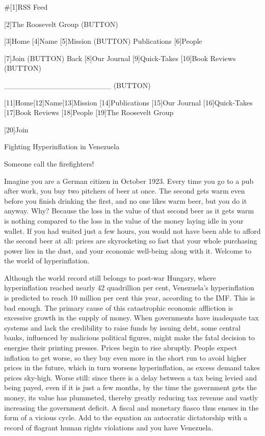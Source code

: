    #[1]RSS Feed

   [2]The Roosevelt Group
   (BUTTON)

   [3]Home [4]Name [5]Mission (BUTTON) Publications [6]People

   [7]Join
   (BUTTON) Back [8]Our Journal [9]Quick-Takes [10]Book Reviews
   (BUTTON)

   ____________________ (BUTTON)

   [11]Home[12]Name[13]Mission [14]Publications [15]Our Journal
   [16]Quick-Takes [17]Book Reviews [18]People
   [19]The Roosevelt Group

   [20]Join

Fighting Hyperinflation in Venezuela

Someone call the firefighters!


   Imagine you are a German citizen in October 1923. Every time you go to
   a pub after work, you buy two pitchers of beer at once. The second gets
   warm even before you finish drinking the first, and no one likes warm
   beer, but you do it anyway. Why? Because the loss in the value of that
   second beer as it gets warm is nothing compared to the loss in the
   value of the money laying idle in your wallet. If you had waited just a
   few hours, you would not have been able to afford the second beer at
   all: prices are skyrocketing so fast that your whole purchasing power
   lies in the dust, and your economic well-being along with it. Welcome
   to the world of hyperinflation.

   Although the world record still belongs to post-war Hungary, where
   hyperinflation reached nearly 42 quadrillion per cent, Venezuela's
   hyperinflation is predicted to reach 10 million per cent this year,
   according to the IMF. This is bad enough. The primary cause of this
   catastrophic economic affliction is excessive growth in the supply of
   money. When governments have inadequate tax systems and lack the
   credibility to raise funds by issuing debt, some central banks,
   influenced by malicious political figures, might make the fatal
   decision to energise their printing presses. Prices begin to rise
   abruptly. People expect inflation to get worse, so they buy even more
   in the short run to avoid higher prices in the future, which in turn
   worsens hyperinflation, as excess demand takes prices sky-high. Worse
   still: since there is a delay between a tax being levied and being
   payed, even if it is just a few months, by the time the government gets
   the money, its value has plummeted, thereby greatly reducing tax
   revenue and vastly increasing the government deficit. A fiscal and
   monetary fiasco thus ensues in the form of a vicious cycle. Add to the
   equation an autocratic dictatorship with a record of flagrant human
   rights violations and you have Venezuela.


